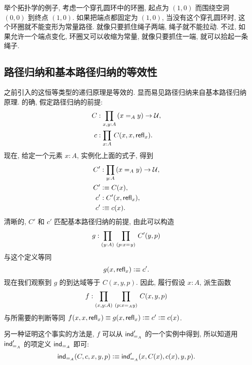 \begin{rmk}
    举个拓扑学的例子, 考虑一个穿孔圆环中的环圈, 起点为 $(1,0)$ 而围绕空洞 $(0,0)$ 到终点 $(1,0)$.
    如果把端点都固定为 $(1,0)$, 当没有这个穿孔圆环时, 这个环圈就不能变形为常量路径.
    就像只要抓住绳子两端, 绳子就不能拉动.
    不过, 如果允许一个端点变化, 环圈又可以收缩为常量, 就像只要抓住一端, 就可以拾起一条绳子.
\end{rmk}

%
%

\subsection{路径归纳和基本路径归纳的等效性}

之前引入的这恒等类型的递归原理是等效的.
显而易见路径归纳来自基本路径归纳原理.
的确, 假定路径归纳的前提:
\begin{align*}
    C &: \prd{x,y:A}(\id[A]{x}{y}) \to \UU,\\
    c &: \prd{x:A} C(x,x,\refl{x}).
\end{align*}
现在, 给定一个元素 $x:A$, 实例化上面的式子, 得到
\begin{align*}
    C' &: \prd{y:A} (\id[A]{x}{y}) \to \UU, \\
    C' &\defeq C(x), \\
    c' &: C'(x,\refl{x}), \\
    c' &\defeq c(x).
\end{align*}
清晰的, $C'$ 和 $c'$ 匹配基本路径归纳的前提, 由此可以构造
\begin{equation*}
    g : \prd{y:A}{p : \id{x}{y}} C'(y,p)
\end{equation*}
与这个定义等同 \[ g(x,\mathsf{refl}_{x}) \vcentcolon\equiv c'.\]
现在我们观察到 $g$ 的到达域等于 $C(x,y,p)$.
因此, 履行假设 $x:A$, 派生函数 \[ f : \prd{x,y:A}{p : \id[A]{x}{y}} C(x,y,p) \]
与所需要的判断等同 $f(x,x,\mathsf{refl}_{x}) \equiv g(x,\mathsf{refl}_{x}) \vcentcolon\equiv c' \vcentcolon\equiv c(x)$.

另一种证明这个事实的方法是, $f$ 可以从 $\mathsf{ind}_{=_{A}}'$ 的一个实例中得到, 所以知道用 $\mathsf{ind}_{=_{A}}'$ 的项定义 $\mathsf{ind}_{=_{A}}$ 即可: \[ \mathsf{ind}_{=_{A}}(C,c,x,y,p) \vcentcolon\equiv \mathsf{ind}_{=_{A}}'(x,C(x),c(x),y,p). \]

